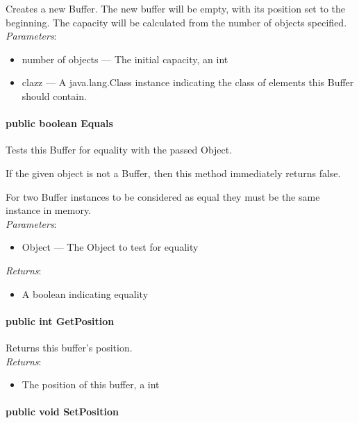 \documentclass[$Date: 2003/06/26 19:29:31 $]{glabarticle}
\begin{document}
Creates a new Buffer. The new buffer will be empty, with its position
set to the beginning.  The capacity will be calculated from the number
of objects specified. \\

\textit{Parameters}:
\begin{itemize}
\item[] number of objects --- The initial capacity, an int
\item[] clazz --- A java.lang.Class instance indicating the class of elements this Buffer should contain.
\end{itemize}

\paragraph{public boolean Equals} 

Tests this Buffer for equality with the passed Object.

If the given object is not a Buffer, then this method immediately  returns false.

For two Buffer instances to be considered as equal they must be the
same instance in memory. \\

\textit{Parameters}:
\begin{itemize}
\item[] Object --- The Object to test for equality 
\end{itemize}

\textit{Returns}:
\begin{itemize}
\item[] A boolean indicating equality
\end{itemize}
 
\paragraph{public int GetPosition}

Returns this buffer's position. \\

\textit{Returns}:
\begin{itemize}
\item[] The position of this buffer, a int
\end{itemize}

\paragraph{public void SetPosition}
\end{document}
